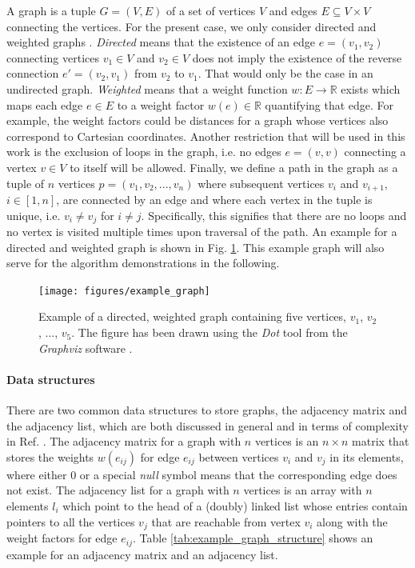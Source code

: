 A graph is a tuple $G = \left(V, E\right)$ of a set of vertices $V$ and edges $E \subseteq V \times V$ 
connecting the vertices. For the present case, we only consider directed and weighted graphs 
\cite[pp. 1-3]{FUH_algo_graphs_2021}.
\textit{Directed} means that the existence of an edge $e = \left(v_1, v_2\right)$ connecting vertices 
$v_1 \in V$ and $v_2 \in V$ does not imply the existence of the reverse connection $e'= \left(v_2, v_1\right)$
from $v_2$ to $v_1$. That would only be the case in an undirected graph.
\textit{Weighted} means that a weight function $w: E \rightarrow \mathbb{R}$ exists which maps each 
edge $e \in E$ to a weight factor $w\left(e\right) \in \mathbb{R}$ quantifying that edge. 
For example, the weight factors could be distances for a graph whose vertices also correspond to Cartesian coordinates.
Another restriction that will be used in this work is the exclusion of loops in the graph, i.e.
no edges $e = \left(v, v\right)$ connecting a vertex $v \in V$ to itself will be allowed.
Finally, we define a path in the graph as a tuple of $n$ vertices $p = \left(v_1, v_2, ..., v_n\right)$
where subsequent vertices $v_i$ and $v_{i+1}$, $i \in \left[1, n\right]$, are connected by an edge and 
where each vertex in the tuple is unique, i.e. $v_i \neq v_j$ for $i \neq j$.
Specifically, this signifies that there are no loops and no vertex is visited multiple times upon 
traversal of the path.
An example for a directed and weighted graph is shown in Fig. \ref{fig:example_graph}.
This example graph will also serve for the algorithm demonstrations in the following.

\begin{figure}[h]
	\begin{center}
		\texttt{[image: figures/example\_graph]}
	\end{center}
	\caption[Example graph.]{
		Example of a directed, weighted graph containing five vertices, $v_1$, $v_2$, ..., $v_5$.
		The figure has been drawn using the \textit{Dot} tool from the \textit{Graphviz} software \cite{Ellson2003}.
		\label{fig:example_graph}}
\end{figure}


\paragraph{Data structures}
There are two common data structures to store graphs, the adjacency matrix and the adjacency list, which are
both discussed in general and in terms of complexity in Ref. \cite[pp. 3-5]{FUH_algo_graphs_2021}.
The adjacency matrix for a graph with $n$ vertices is an $n \times n$ matrix that stores the 
weights $w\left(e_{ij}\right)$ for edge $e_{ij}$ between vertices $v_i$ and $v_j$ in its elements,
where either $0$ or a special \textit{null} symbol means that the corresponding edge does not exist.
The adjacency list for a graph with $n$ vertices is an array with $n$ elements $l_i$ which point 
to the head of a (doubly) linked list whose entries contain pointers to all the vertices $v_j$ that are reachable 
from vertex $v_i$ along with the weight factors for edge $e_{ij}$.
Table \ref{tab:example_graph_structure} shows an example for an adjacency matrix and an adjacency list.

